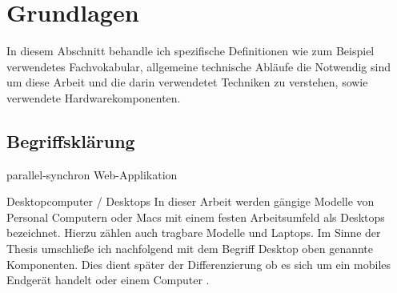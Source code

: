\chapter{Grundlagen}
In diesem Abschnitt behandle ich spezifische Definitionen wie zum Beispiel verwendetes Fachvokabular, allgemeine technische Abläufe die Notwendig sind um diese Arbeit und die darin verwendetet Techniken zu verstehen, sowie verwendete Hardwarekomponenten.

	\section{Begriffsklärung}	
		\Gls{parallel-synchron}
		\Gls{Web-Applikation}

		\Gls{Desktopcomputer / Desktops}
		In dieser Arbeit werden gängige Modelle von Personal Computern oder Macs mit einem festen Arbeitsumfeld als Desktops 		bezeichnet. Hierzu zählen auch tragbare Modelle und Laptops. Im Sinne der Thesis umschließe ich nachfolgend mit dem 		Begriff Desktop oben genannte Komponenten. Dies dient später der Differenzierung ob es sich um ein mobiles Endgerät 			handelt oder einem Computer .

